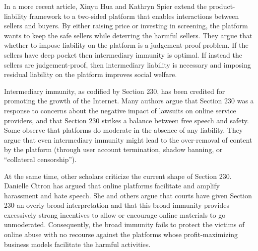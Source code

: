 In a more recent article, Xinyu Hua and Kathryn Spier extend the product-liability framework to a two-sided platform that enables interactions between sellers and buyers. By either raising price or investing in screening, the platform wants to keep the safe sellers while deterring the harmful sellers. They argue that whether to impose liability on the platform is a judgement-proof problem. If the sellers have deep pocket then intermediary immunity is optimal. If instead the sellers are judgement-proof, then intermediary liability is necessary and imposing residual liability on the platform improves social welfare.



Intermediary immunity, as codified by Section 230, has been credited for promoting the growth of the Internet. Many authors argue that Section 230 was a response to concerns about the negative impact of lawsuits on online service providers, and that Section 230 strikes a balance between free speech and safety.
Some observe that platforms do moderate in the absence of any liability. They argue that even intermediary immunity might lead to the over-removal of content by the platform (through user account termination, shadow banning, or ``collateral censorship'').

At the same time, other scholars criticize the current shape of Section 230. Danielle Citron has argued that online platforms facilitate and amplify harassment and hate speech. She and others argue that courts have given Section 230 an overly broad interpretation and that this broad immunity provides excessively strong incentives to allow or encourage online materials to go unmoderated. Consequently, the broad immunity fails to protect the victims of online abuse with no recourse against the platforms whose profit-maximizing business models facilitate the harmful activities.


